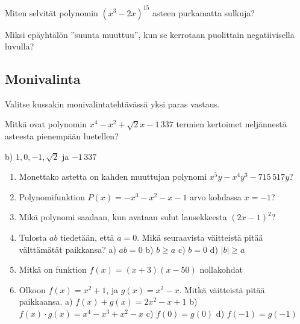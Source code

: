 \begin{tehtava}
Miten selvität polynomin $(x^3-2x)^{15}$ asteen purkamatta sulkuja?
	\begin{vastaus}

	\end{vastaus}
\end{tehtava}

\begin{tehtava}
Miksi epäyhtälön ''suunta muuttuu'', kun se kerrotaan puolittain negatiivisella luvulla?
	\begin{vastaus}

	\end{vastaus}
\end{tehtava}

\subsection*{Monivalinta}

Valitse kussakin monivalintatehtävässä yksi paras vastaus.

\begin{tehtava}
Mitkä ovat polynomin $x^4-x^2+\sqrt{2}x-1\,337$ termien kertoimet neljännestä asteesta pienempään luetellen?
	\begin{alakohdat}
	\end{alakohdat}
	\begin{vastaus}
	b) $1, 0, -1, \sqrt{2}$ ja $-1\,337$
	\end{vastaus}
\end{tehtava}

\begin{enumerate}



\item Monettako astetta on kahden muuttujan polynomi $x^5y-x^4y^3-715\,517y$?
\item Polynomifunktion $P(x)=-x^3-x^2-x-1$ arvo kohdassa $x=-1$?
\item Mikä polynomi saadaan, kun avataan sulut lausekkeesta $(2x-1)^2$?
\item Tulosta $ab$ tiedetään, että $a = 0$. Mikä seuraavista väitteistä pitää välttämätät paikkansa?
a) $ab = 0$
b) $b \geq a$
c) $b = 0$
d) $|b| \geq a$

\item Mitkä on funktion $f(x) = (x+3)(x-50)$ nollakohdat
\item Olkoon $f(x) = x^2 + 1$, ja $g(x) = x^2 - x$. Mitkä väitteistä pitää paikkaansa.
a) $f(x) + g(x) = 2x^2 - x + 1$
b) $f(x) \cdot g(x) = x^4-x^3+x^2-x$
c) $f(0) = g(0)$
d) $f(-1) = g(-1)$
\end{enumerate}


